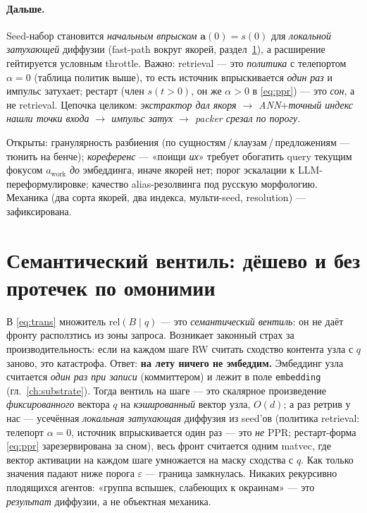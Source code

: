\paragraph{Дальше.} Seed-набор становится \emph{начальным впрыском} $\mathbf{a}(0)=s(0)$
для \emph{локальной затухающей} диффузии (fast-path вокруг якорей, раздел~\ref{sec:semgate}),
а расширение гейтируется условным throttle. Важно: retrieval — это \emph{политика} с
телепортом $\alpha=0$ (таблица политик выше), то есть источник впрыскивается \emph{один
раз} и импульс затухает; рестарт (член $s(t{>}0)$, он же $\alpha>0$ в \eqref{eq:ppr}) —
это \emph{сон}, а не retrieval. Цепочка целиком: \emph{экстрактор дал якоря $\to$
ANN$+$точный индекс нашли точки входа $\to$ импульс затух $\to$ packer срезал по порогу}.

\begin{openq}
Открыты: гранулярность разбиения (по сущностям\,/\,клаузам\,/\,предложениям — тюнить на
бенче); \emph{кореференс} — «поищи \emph{их}» требует обогатить query текущим фокусом
$a_{\text{work}}$ \emph{до} эмбеддинга, иначе якорей нет; порог эскалации к
LLM-переформулировке; качество alias-резолвинга под русскую морфологию. Механика
(два сорта якорей, два индекса, мульти-seed, resolution) — зафиксирована.
\end{openq}

\section{Семантический вентиль: дёшево и без протечек по омонимии}
\label{sec:semgate}

В \eqref{eq:trans} множитель $\text{rel}(B\mid q)$ — это \emph{семантический вентиль}:
он не даёт фронту расползтись из зоны запроса. Возникает законный страх за
производительность: если на каждом шаге RW считать сходство контента узла с $q$ заново,
это катастрофа. Ответ: \textbf{на лету ничего не эмбеддим.} Эмбеддинг узла считается
\emph{один раз при записи} (коммиттером) и лежит в поле \texttt{embedding}
(гл.~\ref{ch:substrate}). Тогда вентиль на шаге — это скалярное произведение
\emph{фиксированного} вектора $q$ на \emph{кэшированный} вектор узла, $O(d)$; а раз
ретрив у нас — усечённая \emph{локальная затухающая} диффузия из seed'ов (политика
retrieval: телепорт $\alpha=0$, источник впрыскивается один раз — это \emph{не} PPR;
рестарт-форма \eqref{eq:ppr} зарезервирована за сном), весь фронт считается одним matvec,
где вектор активации на каждом шаге умножается на маску сходства с $q$. Как только значения падают ниже порога $\varepsilon$ — граница
замкнулась. Никаких рекурсивно плодящихся агентов: «группа вспышек, слабеющих к
окраинам» — это \emph{результат} диффузии, а не объектная механика.

